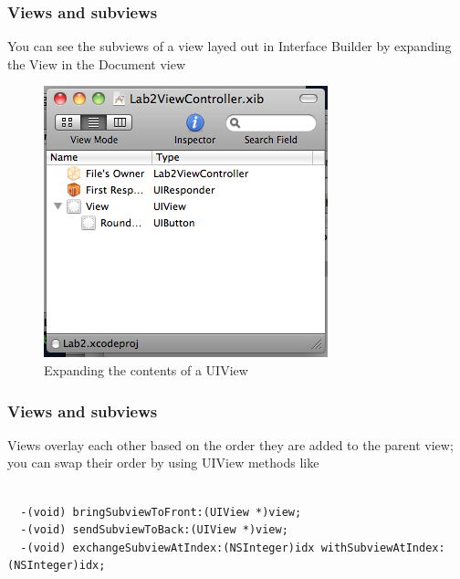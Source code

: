 \documentclass[10pt]{beamer}
\begin{document}
\begin{frame}[fragile]
  \frametitle{Views and subviews}
  You can see the subviews of a view layed out in Interface Builder by expanding the View in the Document view \begin{figure}[htb]
  \begin{center}
  
  \includegraphics[scale=0.5]{UIViewExpand.png}
              
  \caption{Expanding the contents of a UIView}
  \end{center}
  \end{figure}

\end{frame}

\begin{frame}[fragile]
  \frametitle{Views and subviews}
  Views overlay each other based on the order they are added to the parent view; you can swap their order by using UIView methods like \begin{verbatim}
  
  -(void) bringSubviewToFront:(UIView *)view;
  -(void) sendSubviewToBack:(UIView *)view;
  -(void) exchangeSubviewAtIndex:(NSInteger)idx withSubviewAtIndex:(NSInteger)idx;
              
  \end{verbatim}

\end{frame}
\end{document}
